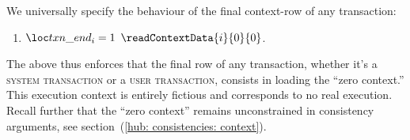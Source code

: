 We universally specify the behaviour of the final context-row of any transaction:
\begin{enumerate}
	\item \If $\transactionEnd _{i} = 1$ \Then $\readContextData {i}{0}{0}$.
\end{enumerate}
\saNote{}
The above thus enforces that the final row of any transaction,
whether it's a \textsc{system transaction} or a \textsc{user transaction},
consists in loading the ``zero context.''
This execution context is entirely fictious and corresponds to no real execution.
Recall further that the ``zero context'' remains unconstrained in consistency arguments,
see section~(\ref{hub: consistencies: context}).
